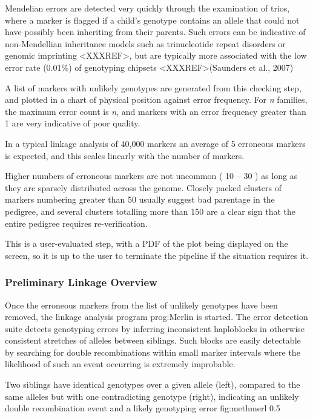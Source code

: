 Mendelian errors are detected very quickly through the examination of trios, where a marker is flagged if a child's genotype contains an allele that could not have possibly been inheriting from their parents.  Such errors can be indicative of non-Mendellian inheritance models such as trinucleotide repeat disorders or genomic imprinting <XXXREF>, but are typically more associated with the low error rate (0.01\%) of genotyping chipsets <XXXREF>(Saunders et al., 2007)

A list of markers with unlikely genotypes are generated from this checking step, and plotted in a chart of physical position against error frequency. For \textit{n} families, the maximum error count is \textit{n}, and markers with an error frequency greater than 1 are very indicative of poor quality.

In a typical linkage analysis of 40,000 markers an average of 5 erroneous markers is expected, and this scales linearly with the number of markers.

Higher numbers of erroneous markers are not uncommon ( 10 – 30 ) as long as they are sparsely distributed across the genome. Closely packed clusters of markers numbering greater than 50 usually suggest bad parentage in the pedigree, and several clusters totalling more than 150 are a clear sign that the entire pedigree requires re-verification.

This is a user-evaluated step, with a PDF of the plot being displayed on the screen, so it is up to the user to terminate the pipeline if the situation requires it.


\subsubsection{Preliminary Linkage Overview}

Once the erroneous markers from the list of unlikely genotypes have been removed, the linkage analysis program \gls{prog:Merlin} is started. The error detection  suite detects genotyping errors by inferring inconsistent haploblocks in otherwise consistent stretches of alleles between siblings. Such blocks are easily detectable by searching for double recombinations within small marker intervals where the likelihood of such an event occurring is extremely improbable.

	{Two siblings have identical genotypes over a given allele (left), compared to the same alleles but with one contradicting genotype (right), indicating an unlikely double recombination event and a likely genotyping error}
	{fig:methmerl}
	{0.5}

